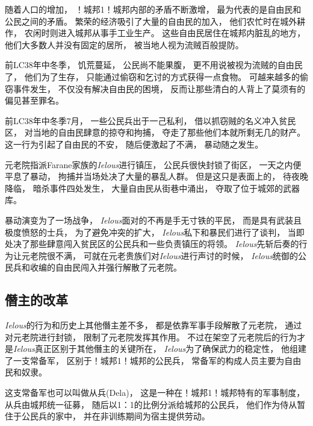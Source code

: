 \documentclass[12pt, a4paper]{ctexart}
\begin{document}
        随着人口的增加，
        ！城邦1！城邦内部的矛盾不断激增，
        最为代表的是自由民和公民之间的矛盾。
        繁荣的经济吸引了大量的自由民的加入，
        他们农忙时在城外耕作，
        农闲时则进入城邦从事手工业生产。
        这些自由民居住在城邦内脏乱的地方，
        他们大多数人并没有固定的居所，
        被当地人视为流贼百般提防。

        前LC38年中冬季，
        饥荒蔓延，
        公民尚不能果腹，
        更不用说被视为流贼的自由民了，
        他们为了生存，
        只能通过偷窃和乞讨的方式获得一点食物。
        可越来越多的偷窃事件发生，
        不仅没有解决自由民的困境，
        反而让那些清白的人背上了莫须有的偏见甚至罪名。

        前LC38年中冬季7月，
        一些公民兵出于一己私利，
        借以抓窃贼的名义冲入贫民区，
        对当地的自由民肆意的掠夺和拘捕，
        夺走了那些他们本就所剩无几的财产。
        这一行为引起了自由民的不安，
        随后便激起了不满，
        暴动随之发生。

        元老院指派Farane家族的\emph{Ielous}进行镇压，
        公民兵很快封锁了街区，
        一天之内便平息了暴动，
        拘捕并当场处决了大量的暴乱人群。
        但是这只是表面上的，
        待夜晚降临，
        暗杀事件四处发生，
        大量自由民从街巷中涌出，
        夺取了位于城郊的武器库。

        暴动演变为了一场战争，
        \emph{Ielous}面对的不再是手无寸铁的平民，
        而是具有武装且极度愤怒的士兵，
        为了避免冲突的扩大，
        \emph{Ielous}私下和暴民们进行了谈判，
        当即处决了那些肆意闯入贫民区的公民兵和一些负责镇压的将领。
        \emph{Ielous}先斩后奏的行为让元老院很不满，
        可就在元老贵族们对\emph{Ielous}进行声讨的时候，
        \emph{Ielous}统御的公民兵和收编的自由民闯入并强行解散了元老院。
    \subsection{僭主的改革}
        \emph{Ielous}的行为和历史上其他僭主差不多，
        都是依靠军事手段解散了元老院，
        通过对元老院进行封锁，
        限制了元老院发挥其作用。
        不过在架空了元老院后的行为才是\emph{Ielous}真正区别于其他僭主的关键所在，
        \emph{Ielous}为了确保武力的稳定性，
        他组建了一支常备军，
        区别于！城邦1！城邦的公民兵，
        常备军的构成人员主要为自由民和奴隶。

        这支常备军也可以叫做从兵(Dela)，
        这是一种在！城邦1！城邦特有的军事制度，
        从兵由城邦统一征募，
        随后以1：1的比例分派给城邦的公民兵，
        他们作为侍从暂住于公民兵的家中，
        并在非训练期间为宿主提供劳动。
\end{document}

